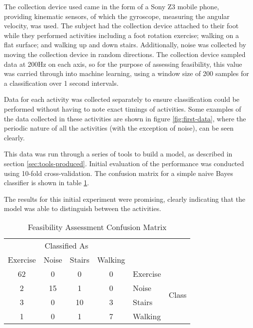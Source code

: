 The collection device used came in the form of a Sony Z3 mobile phone, providing kinematic sensors, of which the gyroscope, measuring the angular velocity, was used. The subject had the collection device attached to their foot while they performed activities including a foot rotation exercise; walking on a flat surface; and walking up and down stairs. Additionally, noise was collected by moving the collection device in random directions. The collection device sampled data at 200Hz on each axis, so for the purpose of assessing feasibility, this value was carried through into machine learning, using a window size of 200 samples for a classification over 1 second intervals.

Data for each activity was collected separately to ensure classification could be performed without having to note exact timings of activities. Some examples of the data collected in these activities are shown in figure \ref{fig:first-data}, where the periodic nature of all the activities (with the exception of noise), can be seen clearly. 

This data was run through a series of tools to build a model, as described in section \ref{sec:tools-produced}. Initial evaluation of the performance was conducted using 10-fold cross-validation. The confusion matrix for a simple naive Bayes classifier is shown in table \ref{tab:first-confusion}.

The results for this initial experiment were promising, clearly indicating that the model was able to distinguish between the activities.

\begin{table}[]
	\centering
	\begin{tabular}{|cccc|ll|}
		\hline
		\multicolumn{4}{|c|}{Classified As}   &          &                        \\
		Exercise & Noise & Stairs & Walking &          &                        \\
		\hline
		62       & 0     & 0      & 0       & Exercise & \multirow{4}{*}{Class} \\
		2        & 15    & 1      & 0       & Noise    &                        \\
		3        & 0     & 10     & 3       & Stairs   &                        \\
		1        & 0     & 1      & 7       & Walking  &                       \\
		\hline
	\end{tabular}
	\caption{Feasibility Assessment Confusion Matrix \label{tab:first-confusion}}
\end{table}


